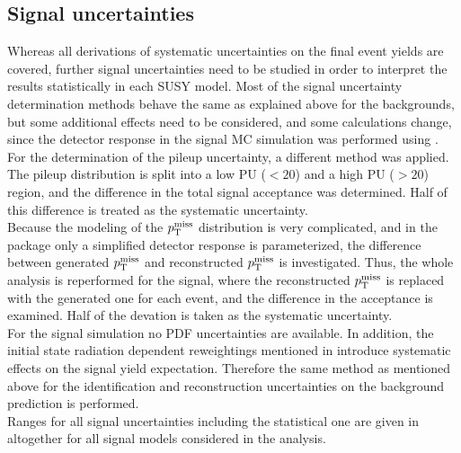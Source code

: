 \subsection{Signal uncertainties}
Whereas all derivations of systematic uncertainties on the final event yields are covered, further signal uncertainties need to be studied in order to interpret the results statistically in each SUSY model.
Most of the signal uncertainty determination methods behave the same as explained above for the backgrounds, but some additional effects need to be considered, and some calculations change, since the detector response in the signal MC simulation was performed using \FASTSIM.\\
For the determination of the pileup uncertainty, a different method was applied. The pileup distribution is split into a low PU ($<20$) and a high PU ($>20$) region, and the difference in the total signal acceptance was determined. Half of this difference is treated as the systematic uncertainty.\\
Because the modeling of the $p_{\mathrm{T}}^\text{miss}$ distribution is very complicated, and in the \FASTSIM package only a simplified detector response is parameterized, the difference between generated $p_{\mathrm{T}}^\text{miss}$ and reconstructed $p_{\mathrm{T}}^\text{miss}$ is investigated. Thus, the whole analysis is reperformed for the signal, where the reconstructed $p_{\mathrm{T}}^\text{miss}$ is replaced with the generated one for each event, and the difference in the acceptance is examined. Half of the devation is taken as the systematic uncertainty.\\
For the signal simulation no PDF uncertainties are available. In addition, the initial state radiation dependent reweightings mentioned in  introduce systematic effects on the signal yield expectation. Therefore the same method as mentioned above for the identification and reconstruction uncertainties on the background prediction is performed.\\
Ranges for all signal uncertainties including the statistical one are given in  altogether for all signal models considered in the analysis.

